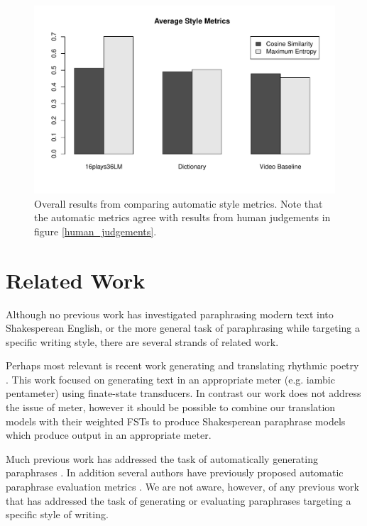 \documentclass[10pt,a5paper,twoside]{article}
\begin{document}
\begin{figure}
  \begin{center}
    \includegraphics[width=5in]{figures/style_metrics.pdf}
    \end{center}
    \caption{Overall results from comparing automatic style metrics.  Note that the automatic metrics agree with results from human judgements in figure \ref{human_judgements}.}
    \label{style_metrics}
\end{figure}

\section{Related Work}
Although no previous work has investigated paraphrasing modern text into Shakesperean English, or the more general task of paraphrasing while targeting a specific writing
style, there are several strands of related work.

Perhaps most relevant is recent work generating and translating rhythmic poetry \cite{Greene10}.  This work focused on generating text in an appropriate
meter (e.g. iambic pentameter) using finate-state transducers.  In contrast our work does not address the issue of meter, however it should be possible to combine our translation
models with their weighted FSTs to produce Shakesperean paraphrase models which produce output in an appropriate meter.

Much previous work has addressed the task of automatically generating paraphrases \cite{Barzilay03,dolan04,Shinyama03,Das09,bannard05,Callison-Burch08,Kok10}.  In addition several authors have previously proposed 
automatic paraphrase evaluation metrics \cite{chen11,Callison-Burch08b,Bangalore00,liu10}.
We are not aware, however, of any previous work that has addressed the task of generating or evaluating
paraphrases targeting a specific style of writing.
\end{document}
